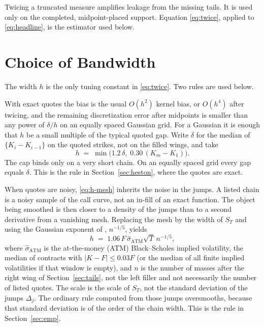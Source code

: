 \documentclass[preprint,12pt,authoryear,times]{elsarticle}
\begin{document}
Twicing a truncated measure amplifies leakage from the missing tails. It is used only on the completed, midpoint-placed support. Equation \eqref{eq:twice}, applied to \eqref{eq:headline}, is the estimator used below.

\section{Choice of Bandwidth}
\label{sec:h}

The width \(h\) is the only tuning constant in \eqref{eq:twice}. Two rules are used below.

With exact quotes the bias is the usual \(O(h^2)\) kernel bias, or \(O(h^4)\) after twicing, and the remaining discretization error after midpoints is smaller than any power of \(\delta/h\) on an equally spaced Gaussian grid. For a Gaussian it is enough that \(h\) be a small multiple of the typical quoted gap. Write \(\delta\) for the median of \(\{K_i-K_{i-1}\}\) on the quoted strikes, not on the filled wings, and take
\begin{equation}
\label{eq:h-mesh}
h
\;=\;
\min\bigl(1.2\,\delta,\; 0.30\,(K_m-K_1)\bigr).
\end{equation}
The cap binds only on a very short chain. On an equally spaced grid every gap equals \(\delta\). This is the rule in Section~\ref{sec:heston}, where the quotes are exact.

When quotes are noisy, \eqref{eq:h-mesh} inherits the noise in the jumps. A listed chain is a noisy sample of the call curve, not an in-fill of an exact function. The object being smoothed is then closer to a density of the jumps than to a second derivative from a vanishing mesh. Replacing the mesh by the width of \(S_T\) and using the Gaussian exponent of \citet{silverman1986}, \(n^{-1/5}\), yields
\begin{equation}
\label{eq:h-den}
h
\;=\;
1.06\,F\,\hat\sigma_{\mathrm{ATM}}\sqrt{T}\,n^{-1/5},
\end{equation}
where \(\hat\sigma_{\mathrm{ATM}}\) is the at-the-money (ATM) Black--Scholes implied volatility, the median of contracts with \(|K-F|\le 0.03F\) (or the median of all finite implied volatilities if that window is empty), and \(n\) is the number of masses after the right wing of Section~\ref{sec:tails}, not the left filler and not necessarily the number of listed quotes. The scale is the scale of \(S_T\), not the standard deviation of the jumps \(\Delta_j\). The ordinary \citeauthor{silverman1986} rule computed from those jumps oversmooths, because that standard deviation is of the order of the chain width. This is the rule in Section~\ref{sec:emp}.
\end{document}

